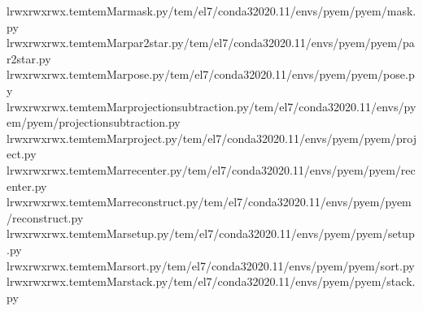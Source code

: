 \documentclass[a4paper,11pt,english]{sphinxmanual}
\begin{document}
\begin{sphinxVerbatim}[commandchars=\\\{\}]
lrwxrwxrwx.temtemMarmask.py\PYGZhy{}\PYGZgt{}/tem/el7/conda3\PYGZhy{}2020.11/envs/pyem/pyem/mask.py
lrwxrwxrwx.temtemMarpar2star.py\PYGZhy{}\PYGZgt{}/tem/el7/conda3\PYGZhy{}2020.11/envs/pyem/pyem/par2star.py
lrwxrwxrwx.temtemMarpose.py\PYGZhy{}\PYGZgt{}/tem/el7/conda3\PYGZhy{}2020.11/envs/pyem/pyem/pose.py
lrwxrwxrwx.temtemMarprojection\PYGZus{}subtraction.py\PYGZhy{}\PYGZgt{}/tem/el7/conda3\PYGZhy{}2020.11/envs/pyem/pyem/projection\PYGZus{}subtraction.py
lrwxrwxrwx.temtemMarproject.py\PYGZhy{}\PYGZgt{}/tem/el7/conda3\PYGZhy{}2020.11/envs/pyem/pyem/project.py
lrwxrwxrwx.temtemMarrecenter.py\PYGZhy{}\PYGZgt{}/tem/el7/conda3\PYGZhy{}2020.11/envs/pyem/pyem/recenter.py
lrwxrwxrwx.temtemMarreconstruct.py\PYGZhy{}\PYGZgt{}/tem/el7/conda3\PYGZhy{}2020.11/envs/pyem/pyem/reconstruct.py
lrwxrwxrwx.temtemMarsetup.py\PYGZhy{}\PYGZgt{}/tem/el7/conda3\PYGZhy{}2020.11/envs/pyem/pyem/setup.py
lrwxrwxrwx.temtemMarsort.py\PYGZhy{}\PYGZgt{}/tem/el7/conda3\PYGZhy{}2020.11/envs/pyem/pyem/sort.py
lrwxrwxrwx.temtemMarstack.py\PYGZhy{}\PYGZgt{}/tem/el7/conda3\PYGZhy{}2020.11/envs/pyem/pyem/stack.py

\end{sphinxVerbatim}
\end{document}
